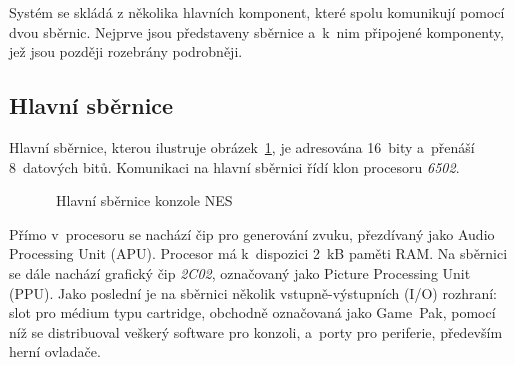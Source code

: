 Systém se skládá z několika hlavních komponent, které spolu komunikují pomocí dvou sběrnic. Nejprve jsou představeny sběrnice a~k~nim připojené komponenty, jež jsou později rozebrány podrobněji.

\subsection{Hlavní sběrnice}
Hlavní sběrnice, kterou ilustruje obrázek~\ref{fig:nes-hlavnisbernice}, je adresována 16~bity a~přenáší 8~datových bitů. Komunikaci na hlavní sběrnici řídí klon procesoru \emph{6502}.

\begin{figure}[ht!]
	\centering
	\caption{~Hlavní sběrnice konzole NES}\label{fig:nes-hlavnisbernice}
\end{figure}

Přímo v~procesoru se nachází čip pro generování zvuku, přezdívaný jako Audio Processing Unit (APU). Procesor má k~dispozici 2~kB paměti RAM. Na sběrnici se dále nachází grafický čip \emph{2C02}, označovaný jako Picture Processing Unit (PPU). Jako poslední je na sběrnici několik vstupně-výstupních (I/O) rozhraní: slot pro médium typu cartridge, obchodně označovaná jako Game~Pak, pomocí níž se distribuoval veškerý software pro konzoli, a~porty pro periferie, především herní ovladače.

